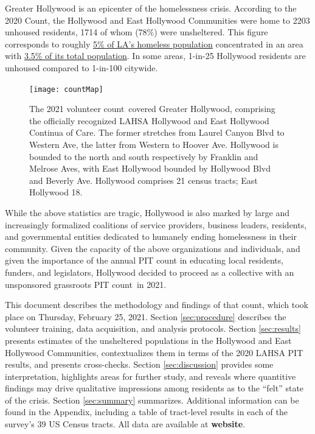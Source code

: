 \documentclass[11pt,twocolumn]{article}
\def\bfr{\bf\color{red}}
\def\Count{count}
\begin{document}
Greater Hollywood is an epicenter of the homelessness crisis. According to the 2020 Count, the 
Hollywood and East Hollywood Communities were home to 2203 unhoused residents, 1714 of whom 
(78\%) were unsheltered. This figure corresponds to roughly 
\href{https://www.lahsa.org/data?id=45-2020-homeless-count-by-community-city}
{5\% of LA's homeless population} concentrated in an area with 
\href{https://geomap.ffiec.gov/FFIECGeocMap/GeocodeMap1.aspx}{3.5\% of its total population}. 
In some areas, 1-in-25 Hollywood residents are unhoused compared to 1-in-100 citywide.

\begin{figure}
	\centering
	\texttt{[image: countMap]}
	\caption{The 2021 volunteer \Count\ covered Greater Hollywood, comprising the 
			officially recognized LAHSA Hollywood and East Hollywood Continua
			of Care. The former stretches from Laurel Canyon Blvd to Western Ave,
			the latter from Western to Hoover Ave. Hollywood is bounded to the north
			and south respectively by Franklin	and Melrose Aves, with East Hollywood
			bounded by Hollywood Blvd and Beverly Ave. Hollywood comprises
			21 census tracts; East Hollywood 18.}
	\label{fig:map}	
\end{figure}

While the above statistics are tragic, Hollywood is also marked by large and increasingly formalized
coalitions of service providers, business leaders, residents, and governmental entities dedicated to 
humanely ending homelessness in their community. Given the capacity of the above organizations and 
individuals, and given the importance of the annual PIT count in educating local residents, funders, and
legislators, Hollywood decided to proceed as a collective with an unsponsored grassroots PIT \Count\
in 2021.

This document describes the methodology and findings of that \Count, which took place on Thursday, 
February 25, 2021. Section \ref{sec:procedure} describes the volunteer training, data acquisition, 
and analysis protocols. Section \ref{sec:results} presents estimates of the unsheltered 
populations in the Hollywood and East Hollywood Communities, contextualizes them in 
terms of the 2020 LAHSA PIT results, and presents cross-checks. Section \ref{sec:discussion} 
provides some interpretation, highlights areas for further study, and reveals where quantitive 
findings may drive qualitative impressions among residents as to the ``felt'' state of the crisis. 
Section \ref{sec:summary} summarizes. Additional information can be found in the Appendix, 
including a table of tract-level results in each of the survey's 39 US Census tracts. All data are 
available at {\bfr website}.
\end{document}
